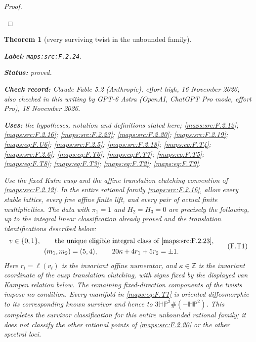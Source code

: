 \documentclass[11pt,a4paper]{article}
\newtheorem{theorem}{Theorem}[section]
\theoremstyle{definition}
\newcommand{\StatementRecord}[4]{\par\smallskip\begingroup\upshape\raggedright\noindent\textbf{Label:} \nolinkurl{#1}.\par\noindent\textbf{Status:} #2.\par\noindent\textbf{Check record:} #3.\par\noindent\textbf{Uses:} #4.\par\endgroup\smallskip}
\newcommand{\CurrentChecker}{GPT-6 Astra (OpenAI, ChatGPT Pro mode, effort Pro), 18 November 2026}
\begin{document}
\begin{proof}
\begin{enumerate}[label=\arabic*.]
\end{enumerate}
\end{proof}




\begin{theorem}[every surviving twist in the unbounded family]\label{maps:src:F.2.24}
\StatementRecord{maps:src:F.2.24}{proved}{Claude Fable 5.2 (Anthropic), effort high, 16 November 2026; also checked in this writing by \CurrentChecker}{the hypotheses, notation and definitions stated here; \cref{maps:src:F.2.12}; \cref{maps:src:F.2.16}; \cref{maps:src:F.2.23}; \cref{maps:src:F.2.20}; \cref{maps:src:F.2.19}; \cref{maps:eq:F.U6}; \cref{maps:src:F.2.5}; \cref{maps:src:F.2.18}; \cref{maps:eq:F.T4}; \cref{maps:src:F.2.6}; \cref{maps:eq:F.T6}; \cref{maps:eq:F.T7}; \cref{maps:eq:F.T5}; \cref{maps:eq:F.T8}; \cref{maps:eq:F.T3}; \cref{maps:eq:F.T2}; \cref{maps:eq:F.T9}}


Use the fixed Kuhn cusp and the affine translation clutching
convention of \ref{maps:src:F.2.12}.  In the entire rational family \ref{maps:src:F.2.16},
allow every stable lattice, every free affine finite lift,
and every pair of actual finite multiplicities.
The data with $\pi_1=1$ and $H_2=H_3=0$ are precisely the
following, up to the integral linear classification already
proved and the translation identifications described below:
\[
\begin{gathered}
 v\in\{0,1\},\qquad
 \text{the unique eligible integral class of \ref{maps:src:F.2.23}},\\
 (m_1,m_2)=(5,4),\qquad
 20\kappa+4r_1+5r_2=\pm1.
\end{gathered}
 \tag{F.T1}\label{maps:eq:F.T1}
\]
Here $r_i=\ell(v_i)$ is the invariant affine numerator, and
$\kappa\in\mathbb Z$ is the invariant coordinate of the
cusp translation clutching, with signs fixed by the displayed
van Kampen relation below.  The remaining fixed-direction
components of the twists impose no condition.
Every manifold in \eqref{maps:eq:F.T1} is oriented diffeomorphic to its
corresponding known survivor and hence to
$3\mathbb{HP}^2\#(-\mathbb{HP}^2)$.
This completes the survivor classification for this entire
unbounded rational family; it does not classify the other
rational points of \ref{maps:src:F.2.20} or the other spectral loci.

\end{theorem}
\end{document}
